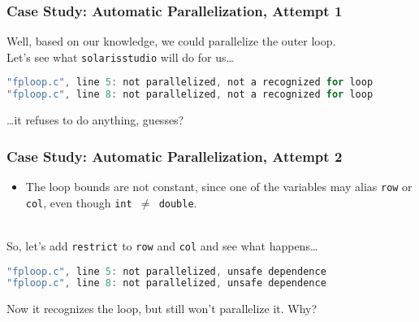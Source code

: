 \begin{frame}[fragile]
  \frametitle{Case Study: Automatic Parallelization, Attempt 1}

  
  Well, based on our knowledge, we could parallelize the outer loop.\\[1em]
  Let's see what {\tt solarisstudio} will do for us\ldots
  

  \begin{lstlisting}[language=C]
% solarisstudio-cc -xautopar -xloopinfo -O3 -c fploop.c
"fploop.c", line 5: not parallelized, not a recognized for loop
"fploop.c", line 8: not parallelized, not a recognized for loop
  \end{lstlisting}

  
  \ldots it refuses to do anything, guesses?
  

\end{frame}

\begin{frame}[fragile]
  \frametitle{Case Study: Automatic Parallelization, Attempt 2}


  \begin{itemize}
    \item The loop bounds are not constant, since one of the variables may alias
      {\tt row} or {\tt col}, even though {\tt int $\neq$ double}.
  \end{itemize}
~\\[1em]

  So, let's add {\tt restrict} to {\tt row} and {\tt col} and see what
  happens\ldots

  \begin{lstlisting}[language=C]
% solarisstudio-cc -O3 -xautopar -xloopinfo -c fploop.c
"fploop.c", line 5: not parallelized, unsafe dependence
"fploop.c", line 8: not parallelized, unsafe dependence
  \end{lstlisting}

  Now it recognizes the loop, but still won't parallelize it. Why?


\end{frame}

